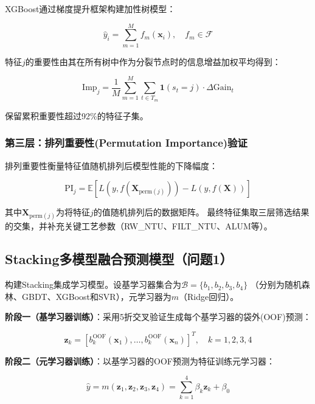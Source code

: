 \documentclass[12pt,a4paper]{ctexart}
\begin{document}
XGBoost通过梯度提升框架构建加性树模型\cite{ref2}：

\begin{equation}\label{eq:xgb}
\hat{y}_i = \sum_{m=1}^{M} f_m(\mathbf{x}_i), \quad f_m \in \mathcal{F}
\end{equation}

特征$j$的重要性由其在所有树中作为分裂节点时的信息增益加权平均得到：

\begin{equation}\label{eq:importance}
\mathrm{Imp}_j = \frac{1}{M}\sum_{m=1}^{M}\sum_{t \in T_m} \mathbf{1}(s_t=j) \cdot \Delta\mathrm{Gain}_t
\end{equation}

保留累积重要性超过92\%的特征子集。

\subsubsection{第三层：排列重要性(Permutation Importance)验证}

排列重要性衡量特征值随机排列后模型性能的下降幅度\cite{ref3}：

\begin{equation}\label{eq:perm}
\mathrm{PI}_j = \mathbb{E}[L(y, f(\mathbf{X}_{\mathrm{perm}(j)})) - L(y, f(\mathbf{X}))]
\end{equation}

其中$\mathbf{X}_{\mathrm{perm}(j)}$为将特征$j$的值随机排列后的数据矩阵。
最终特征集取三层筛选结果的交集，并补充关键工艺参数（RW\_NTU、FILT\_NTU、ALUM等）。

\subsection{Stacking多模型融合预测模型（问题1）}

构建Stacking集成学习模型\cite{ref4}。设基学习器集合为$\mathcal{B} = \{b_1, b_2, b_3, b_4\}$
（分别为随机森林、GBDT、XGBoost和SVR），元学习器为$m$（Ridge回归）。

\textbf{阶段一（基学习器训练）}：采用5折交叉验证生成每个基学习器的袋外(OOF)预测：

\begin{equation}\label{eq:stack1}
\mathbf{z}_k = [b_k^{\mathrm{OOF}}(\mathbf{x}_1), \ldots, b_k^{\mathrm{OOF}}(\mathbf{x}_n)]^T, \quad k=1,2,3,4
\end{equation}

\textbf{阶段二（元学习器训练）}：以基学习器的OOF预测为特征训练元学习器：

\begin{equation}\label{eq:stack2}
\hat{y} = m(\mathbf{z}_1, \mathbf{z}_2, \mathbf{z}_3, \mathbf{z}_4) = \sum_{k=1}^{4} \beta_k \mathbf{z}_k + \beta_0
\end{equation}
\end{document}
